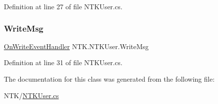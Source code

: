 Definition at line 27 of file N\+T\+K\+User.\+cs.

\mbox{\label{class_n_t_k_1_1_n_t_k_user_a7200653be03c0a22ef54b514c04b80b3}} 
\subsubsection{\texorpdfstring{WriteMsg}{WriteMsg}}
{\footnotesize\ttfamily \mbox{\hyperlink{namespace_n_t_k_a664e2a81c1b642a3270f33d0848ac27e}{On\+Write\+Event\+Handler}} N\+T\+K.\+N\+T\+K\+User.\+Write\+Msg}







Definition at line 31 of file N\+T\+K\+User.\+cs.



The documentation for this class was generated from the following file\+:\begin{DoxyCompactItemize}
\item 
N\+T\+K/\mbox{\hyperlink{_n_t_k_user_8cs}{N\+T\+K\+User.\+cs}}\end{DoxyCompactItemize}
